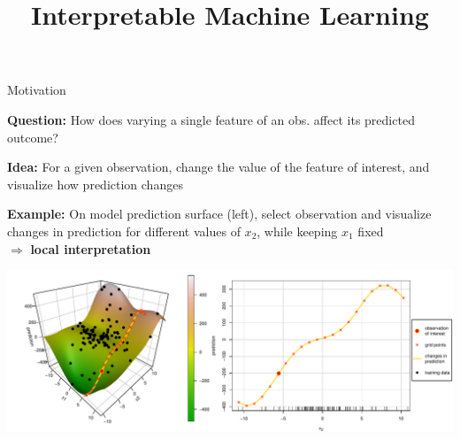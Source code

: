 \documentclass[11pt,compress,t,notes=noshow, aspectratio=169, xcolor=table]{beamer}
\title{Interpretable Machine Learning}
\date{}
\begin{document}
\newcommand{\titlefigure}{figure/feature-effect}
\newcommand{\learninggoals}{
\item ICE curves as local effect method
\item How to sample grid points for ICE curves
}



\begin{frame}{Motivation}

\textbf{Question:} How does varying a single feature of an obs. affect its predicted outcome?

\smallskip

\textbf{Idea:} For a given observation, change the value of the feature of interest, and visualize how prediction changes

\smallskip

\textbf{Example:} On model prediction surface (left), select observation and visualize changes in prediction for different values of $x_2$, while keeping $x_1$ fixed \\ $\Rightarrow$ \textbf{local interpretation}

\bigskip
\centering
\includegraphics[width=\textwidth]{figure/ice_motivation}

\end{frame}
\end{document}
